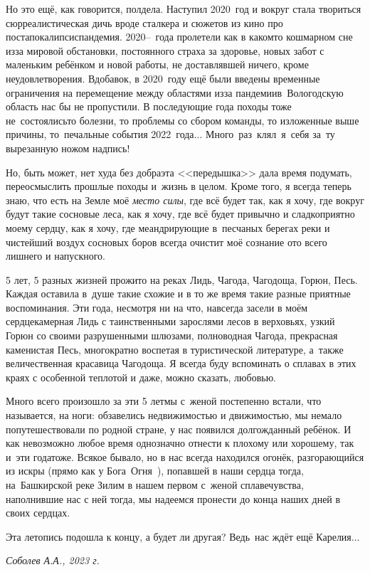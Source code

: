 {Но это ещё, как говорится, полдела. Наступил 2020~год и вокруг стала твориться сюрреалистическая дичь вроде сталкера и сюжетов из кино про постапокалипсис\mdash пандемия. 2020\thinspace\nobreakdash--~года пролетели как в каком\sdash то кошмарном сне из\sdash за мировой обстановки, постоянного страха за здоровье, новых забот с маленьким ребёнком и новой работы, не доставлявшей ничего, кроме неудовлетворения. Вдобавок, в 2020~году ещё были введены временные ограничения на перемещение между областями из\sdash за пандемии\mdash в~Вологодскую область нас бы не пропустили. В последующие года походы тоже не~состоялись\mdash то болезни, то проблемы со сбором команды, то изложенные выше причины, то~печальные события 2022~года$\ldots$ Много~раз~клял~я~себя за~ту вырезанную ножом надпись!

Но, быть может, нет худа без добра\mdash эта <<передышка>> дала время подумать, переосмыслить прошлые походы и~жизнь в целом. Кроме того, я всегда теперь знаю, что есть на Земле моё \textit{место силы}, где всё будет так, как я хочу, где вокруг будут такие сосновые леса, как я хочу, где всё будет привычно и сладко\sdash приятно моему сердцу, как я хочу, где меандрирующие в~песчаных берегах реки и чистейший воздух сосновых боров всегда очистит моё сознание ото всего лишнего и напускного.

5 лет, 5 разных жизней прожито на реках Лидь, Чагода, Чагодоща, Горюн, Песь. Каждая оставила в~душе такие схожие и в то же время такие разные приятные воспоминания. Эти года, несмотря ни на что, навсегда засели в моём сердце\mdash камерная Лидь с таинственными зарослями лесов в верховьях, узкий Горюн со своими разрушенными шлюзами, полноводная Чагода, прекрасная каменистая Песь, многократно воспетая в туристической литературе, а~также величественная красавица Чагодоща. Я всегда буду вспоминать о сплавах в этих краях с особенной теплотой и даже, можно сказать, любовью.

Много всего произошло за эти 5 лет\mdash мы с~женой постепенно встали, что называется, на ноги: обзавелись недвижимостью и движимостью, мы немало попутешествовали по родной стране, у нас появился долгожданный ребёнок. И как невозможно любое время однозначно отнести к плохому или хорошему, так и~эти года\mdash тоже. Всякое бывало, но в нас всегда находился огонёк, разгорающийся из искры (прямо как у Бога~Огня~\cite{Территория}), попавшей в наши сердца тогда, на~Башкирской реке Зилим в нашем первом с~женой сплаве\mdash чувства, наполнившие нас с ней тогда, мы надеемся пронести до конца наших дней в своих сердцах.

Эта летопись подошла к концу, а будет ли другая? Ведь~нас ждёт ещё Карелия$\ldots$


}
\vspace{5mm}
\begin{flushright}
\textit{Соболев А.А., 2023 г.}
\end{flushright}

